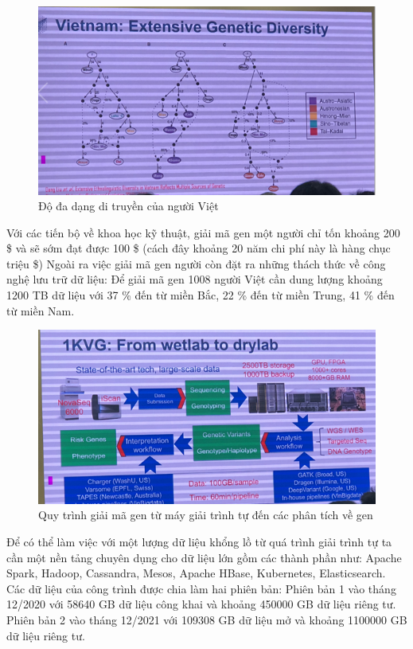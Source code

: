 \documentclass[14pt, a4paper]{article}
\numberwithin{equation}{section}
\numberwithin{figure}{section}
\numberwithin{dl}{section}
\numberwithin{md}{section}
\numberwithin{bd}{section}
\numberwithin{dn}{section}
\numberwithin{hq}{section}
\begin{document}
    \begin{figure}[h!]
        \centering
        \includegraphics{Vietnam_Extensive_Genetic_Diversity.png}
        \caption{Độ đa dạng di truyền của người Việt}
    \end{figure}

    Với các tiến bộ về khoa học kỹ thuật, giải mã gen một người chỉ tốn khoảng 200 \$ và sẽ sớm đạt được 100 \$ (cách đây khoảng 20 năm chi phí này là hàng chục triệu \$)
    Ngoài ra việc giải mã gen người còn đặt ra những thách thức về công nghệ lưu trữ dữ liệu: Để giải mã gen 1008 người Việt cần dung lượng khoảng 1200 TB dữ liệu với 37 \% đến từ miền Bắc, 22 \% đến từ miền Trung, 41 \% đến từ miền Nam.
    
    \begin{figure}[h!]
        \centering
        \includegraphics{Wetlab_to_Drylab.png}
        \caption{Quy trình giải mã gen từ máy giải trình tự đến các phân tích về gen}
    \end{figure}

    Để có thể làm việc với một lượng dữ liệu khổng lồ từ quá trình giải trình tự ta cần một nền tảng chuyên dụng cho dữ liệu lớn gồm các thành phần như: Apache Spark, Hadoop, Cassandra, Mesos, Apache HBase, Kubernetes, Elasticsearch.
    Các dữ liệu của công trình được chia làm hai phiên bản: Phiên bản 1 vào tháng 12/2020 với 58640 GB dữ liệu công khai và khoảng 450000 GB dữ liệu riêng tư. Phiên bản 2 vào tháng 12/2021 với 109308 GB dữ liệu mở và khoảng 1100000 GB dữ liệu riêng tư.
\end{document}
